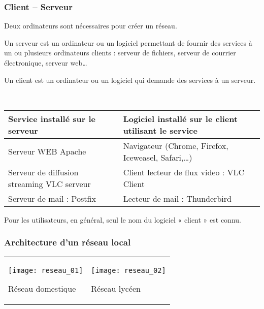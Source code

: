 \subsubsection{Client -- Serveur}
Deux ordinateurs sont nécessaires pour créer un réseau.
\begin{defi}[Serveur]
Un serveur est un ordinateur ou un logiciel permettant de fournir des services à un ou plusieurs ordinateurs clients : serveur de fichiers, serveur de courrier électronique, serveur web…
\end{defi}

\begin{defi}[Client]
Un client est un ordinateur ou un logiciel qui demande des services à un serveur. 
\end{defi}

\begin{exemple}~\\


\begin{center}
\begin{tabular}{|l|l|}
\hline
Service installé sur le serveur	& Logiciel installé sur le client utilisant le service \\ \hline
Serveur WEB Apache	&Navigateur (Chrome, Firefox, Iceweasel, Safari,…) \\ \hline
Serveur de diffusion streaming VLC serveur	& Client lecteur de flux video : VLC Client\\ \hline
Serveur de mail : Postfix	&Lecteur de mail : Thunderbird\\ \hline
\end{tabular}
\end{center}
\end{exemple}

Pour les utilisateurs, en général, seul le nom du logiciel « client » est connu.

\subsubsection{Architecture d’un réseau local}
 	 
\begin{center}
\begin{tabular}{p{}p{}}
\begin{center}
\texttt{[image: reseau\_01]}

Réseau domestique
\end{center} &
\begin{center}
\texttt{[image: reseau\_02]}

Réseau lycéen
\end{center}
\end{tabular}
\end{center}


